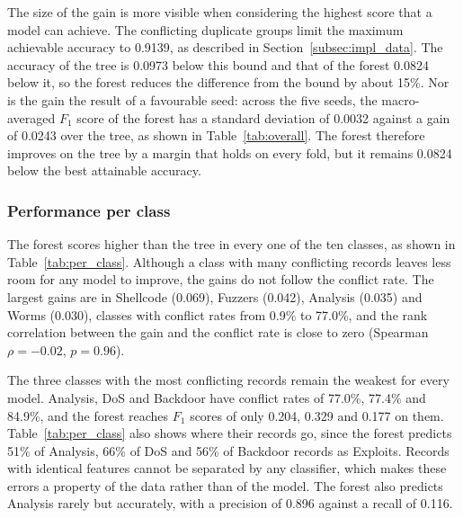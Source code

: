 \documentclass[conference,10pt]{IEEEtran}
\begin{document}
The size of the gain is more visible when considering the highest score that a
model can achieve. The conflicting duplicate groups limit the maximum
achievable accuracy to 0.9139, as described in Section~\ref{subsec:impl_data}. The accuracy of the tree is 0.0973 below this bound and that of the forest
0.0824 below it, so the forest reduces the difference from the bound by
about 15\%. Nor is the gain the result of a favourable seed: across the five seeds, the
macro-averaged $F_1$ score of the forest has a standard deviation of 0.0032 against a gain of 0.0243 over the tree, as shown in Table~\ref{tab:overall}. The forest therefore
improves on the tree by a margin that holds on every fold, but it remains 0.0824 below the best attainable accuracy.

\subsubsection{Performance per class}
%

The forest scores higher than the tree in every one of the ten classes, as shown in Table~\ref{tab:per_class}. Although a class
with many conflicting records leaves less room for any model to improve, the
gains do not follow the conflict rate. The largest gains are in Shellcode (0.069),
Fuzzers (0.042), Analysis (0.035) and Worms (0.030), classes with conflict
rates from 0.9\% to 77.0\%, and the rank correlation between the gain and the
conflict rate is close to zero (Spearman $\rho = -0.02$, $p = 0.96$). 

The three classes with the most conflicting records remain the weakest for
every model. Analysis, DoS and Backdoor have conflict rates of 77.0\%, 77.4\%
and 84.9\%, and the forest reaches $F_1$ scores of only 0.204, 0.329 and 0.177
on them. Table~\ref{tab:per_class} also shows where their records go, since
the forest predicts 51\% of Analysis, 66\% of DoS and 56\% of Backdoor records as
Exploits. Records with identical features cannot be separated by any
classifier, which makes these errors a property of the data rather than of
the model. The forest also predicts Analysis rarely but accurately, with a precision of 0.896 against a recall of 0.116.
\end{document}
